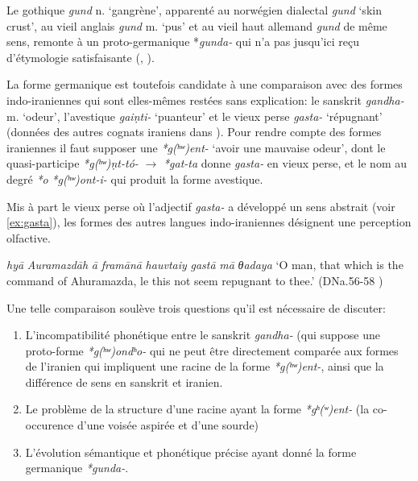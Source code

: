 \documentclass[11pt]{article}
\newcommand{\ipa}[1]{{\phon\textit{#1}}}
\begin{document}
Le gothique \ipa{gund} n. `gangrène', apparenté au norwégien dialectal \ipa{gund} `skin crust', au vieil anglais \ipa{gund} m. `pus' et au vieil haut allemand \ipa{gund} de même sens, remonte à un proto-germanique *\ipa{gunda-} qui n'a pas jusqu'ici reçu d'étymologie satisfaisante (\citealt[195]{kroonen13dict}, \citealt[163, G116]{lehmann86gothic}).

La forme germanique est toutefois candidate à une comparaison avec des formes indo-iraniennes qui sont elles-mêmes restées sans explication: le sanskrit \ipa{gandha-} m. `odeur', l'avestique \ipa{gaiṇti-} `puanteur' et le vieux perse \ipa{gasta-} `répugnant' (données des autres cognats iraniens dans \citealt[103-104]{cheung07dictionary}). Pour rendre compte des formes iraniennes il faut supposer une \ipa{*g(ʰʷ)ent-} `avoir une mauvaise odeur', dont le quasi-participe \ipa{*g(ʰʷ)ṇt-tó-} $\rightarrow$ \ipa{*gat-ta} donne \ipa{gasta-} en vieux perse, et le nom au degré \ipa{*o} \ipa{*g(ʰʷ)ont-i-} qui produit la forme avestique.

Mis à part le vieux perse où l'adjectif \ipa{gasta-} a développé un sens abstrait (voir \ref{ex:gasta}), les formes des autres langues indo-iraniennes désignent une perception olfactive. 

\begin{exe}
\ex \label{ex:gasta}
\glt \ipa{martiyā} \ipa{hyā} \ipa{Auramazdāh} \ipa{ā} \ipa{framānā} \ipa{hauvtaiy} \ipa{gastā} \ipa{mā} \ipa{θadaya}
\glt `O man, that which is the command of Ahuramazda, le this not seem repugnant to thee.' (DNa.56-58 \citealt[137]{kent53op})
\end{exe}

Une telle comparaison soulève trois questions qu'il est nécessaire de discuter: 

\begin{enumerate}
\item L'incompatibilité phonétique entre le sanskrit \ipa{gandha-} (qui suppose une proto-forme \ipa{*g(ʰʷ)ondʰo-} qui ne peut être directement comparée aux formes de l'iranien qui impliquent une racine de la forme \ipa{*g(ʰʷ)ent-}, ainsi que la différence de sens en sanskrit et iranien.
\item Le problème de la structure d'une  racine ayant la forme \ipa{*gʰ(ʷ)ent-} (la co-occurence d'une voisée aspirée et d'une sourde)
\item L'évolution sémantique et phonétique précise ayant donné la forme germanique \ipa{*gunda-}.
\end{enumerate}
\end{document}
